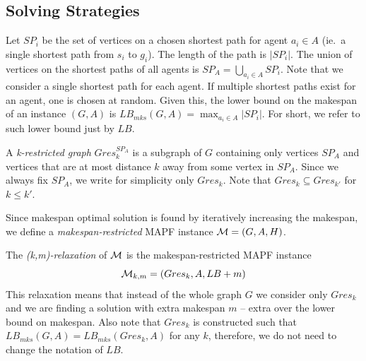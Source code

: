 \subsection*{Solving Strategies}
%
%
Let $SP_i$ be the set of vertices on a chosen shortest path for agent $a_i \in A$ (ie.\ a single shortest path from $s_i$ to $g_i$). The length of the path is $|SP_i|$. The union of vertices on the shortest paths of all agents is $SP_A = \bigcup_{a_i \in A} SP_i$. Note that we consider a single shortest path for each agent. If multiple shortest paths exist for an agent, one is chosen at random. Given this, the lower bound on the makespan of an instance $(G,A)$ is $LB_{mks}(G,A) = \max_{a_i \in A} |SP_i|$. For short, we refer to such lower bound just by $LB$.


A \emph{k-restricted graph} $Gres_{k}^{SP_A}$ is a subgraph of $G$ containing only vertices $SP_A$ and vertices that are at most distance $k$ away from some vertex in $SP_A$. %
Since we always fix $SP_A$, we write for simplicity only $Gres_k$. Note that $Gres_k \subseteq Gres_{k'}$ for $k \leq k'$. %

Since makespan optimal solution is found by iteratively increasing the makespan, we define a \emph{makespan-restricted} MAPF instance $\mathcal{M} = (G,A,H)$. %

The \emph{(k,m)-relaxation} of $\mathcal{M}$ is the makespan-restricted MAPF instance
\[
  {\mathcal{M}}_{k,m} = (Gres_k,A,LB+m)
\]
This relaxation means that instead of the whole graph $G$ we consider only $Gres_k$ and we are finding a solution with extra makespan $m$ -- extra over the lower bound on makespan. Also note that $Gres_k$ is constructed such that $LB_{mks}(G,A) = LB_{mks}(Gres_k,A)$ for any $k$, therefore, we do not need to change the notation of $LB$.

